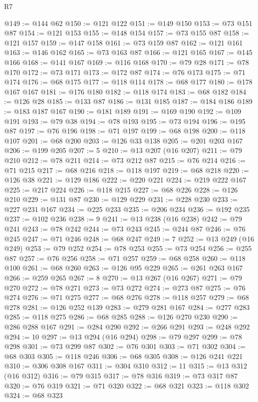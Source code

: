 \begin{lexlean}{R7}
\begin{coremodule}
@149 := @144 @62
@150 := @121 @122
@151 := @149 @150
@153 := @73 @151 @87
@154 := @121 @153
@155 := @148 @154
@157 := @73 @155 @87
@158 := @121 @157
@159 := @147 @158
@161 := @73 @159 @87
@162 := @121 @161
@163 := @146 @162
@165 := @73 @163 @87
@166 := @121 @165
@167 := @145 @166
@168 := @141 @167
@169 := @116 @168
@170 := @79 @28
@171 := @78 @170
@172 := @73 @171
@173 := @172 @87
@174 := @76 @173
@175 := @71 @174
@176 := @68 @175
@177 := @118 @114
@178 := @68 @177
@180 := @178 @167 @167
@181 := @176 @180
@182 := @118 @174
@183 := @68 @182
@184 := @126 @28
@185 := @133 @87
@186 := @131 @185
@187 := @184 @186
@189 := @183 @187 @167
@190 := @181 @189
@191 := @169 @190
@192 := @109 @191
@193 := @79 @38
@194 := @78 @193
@195 := @73 @194
@196 := @195 @87
@197 := @76 @196
@198 := @71 @197
@199 := @68 @198
@200 := @118 @107
@201 := @68 @200
@203 := @126 @33 @138
@205 := @201 @203 @167
@206 := @199 @205
@207 := 5
@210 := @13 @207 (@16 @207)
@211 := @79 @210
@212 := @78 @211
@214 := @73 @212 @87
@215 := @76 @214
@216 := @71 @215
@217 := @68 @216
@218 := @118 @197
@219 := @68 @218
@220 := @126 @38
@221 := @129 @186
@222 := @220 @221
@224 := @219 @222 @167
@225 := @217 @224
@226 := @118 @215
@227 := @68 @226
@228 := @126 @210
@229 := @131 @87
@230 := @129 @229
@231 := @228 @230
@233 := @227 @231 @167
@234 := @225 @233
@235 := @206 @234
@236 := @192 @235
@237 := @102 @236
@238 := 9
@241 := @13 @238 (@16 @238)
@242 := @79 @241
@243 := @78 @242
@244 := @73 @243
@245 := @244 @87
@246 := @76 @245
@247 := @71 @246
@248 := @68 @247
@249 := 7
@252 := @13 @249 (@16 @249)
@253 := @79 @252
@254 := @78 @253
@255 := @73 @254
@256 := @255 @87
@257 := @76 @256
@258 := @71 @257
@259 := @68 @258
@260 := @118 @100
@261 := @68 @260
@263 := @126 @95 @229
@265 := @261 @263 @167
@266 := @259 @265
@267 := 8
@270 := @13 @267 (@16 @267)
@271 := @79 @270
@272 := @78 @271
@273 := @73 @272
@274 := @273 @87
@275 := @76 @274
@276 := @71 @275
@277 := @68 @276
@278 := @118 @257
@279 := @68 @278
@281 := @126 @252 @139
@283 := @279 @281 @167
@284 := @277 @283
@285 := @118 @275
@286 := @68 @285
@288 := @126 @270 @230
@290 := @286 @288 @167
@291 := @284 @290
@292 := @266 @291
@293 := @248 @292
@294 := 10
@297 := @13 @294 (@16 @294)
@298 := @79 @297
@299 := @78 @298
@301 := @73 @299 @87
@302 := @76 @301
@303 := @71 @302
@304 := @68 @303
@305 := @118 @246
@306 := @68 @305
@308 := @126 @241 @221
@310 := @306 @308 @167
@311 := @304 @310
@312 := 11
@315 := @13 @312 (@16 @312)
@316 := @79 @315
@317 := @78 @316
@319 := @73 @317 @87
@320 := @76 @319
@321 := @71 @320
@322 := @68 @321
@323 := @118 @302
@324 := @68 @323

\end{coremodule}
\end{lexlean}
